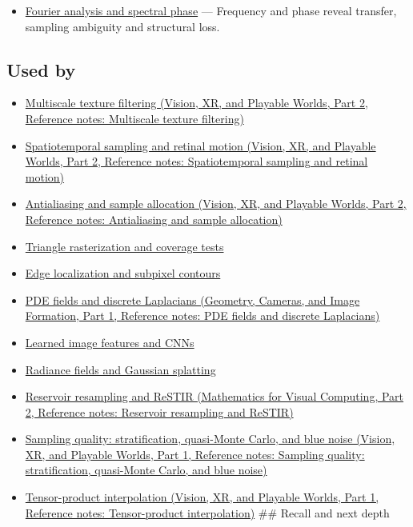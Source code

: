 \hypertarget{appendix-6a7869dd79a6-prerequisites}{}

\begin{itemize}
\tightlist
\item
  \hyperref[appendix-b60686ba06a1]{Fourier analysis and spectral phase} --- Frequency and phase reveal transfer, sampling ambiguity and structural loss.
\end{itemize}

\subsection{Used by}\label{appendix-6a7869dd79a6-used-by}

\hypertarget{appendix-6a7869dd79a6-used-by}{}

\begin{itemize}
\item
  \href{../07-Vision-XR-and-Playable-Worlds-P02/main.pdf\#appendix-b677a85ba76f}{Multiscale texture filtering (Vision, XR, and Playable Worlds, Part 2, Reference notes: Multiscale texture filtering)}
\item
  \href{../07-Vision-XR-and-Playable-Worlds-P02/main.pdf\#appendix-70895739febb}{Spatiotemporal sampling and retinal motion (Vision, XR, and Playable Worlds, Part 2, Reference notes: Spatiotemporal sampling and retinal motion)}
\item
  \href{../07-Vision-XR-and-Playable-Worlds-P02/main.pdf\#appendix-4192b2bdd21e}{Antialiasing and sample allocation (Vision, XR, and Playable Worlds, Part 2, Reference notes: Antialiasing and sample allocation)}
\item
  \hyperref[appendix-ed3f9bc298fe]{Triangle rasterization and coverage tests}
\item
  \hyperref[appendix-36022286b03e]{Edge localization and subpixel contours}
\item
  \href{../03-Geometry-Cameras-and-Image-Formation-P01/main.pdf\#appendix-1988d465c119}{PDE fields and discrete Laplacians (Geometry, Cameras, and Image Formation, Part 1, Reference notes: PDE fields and discrete Laplacians)}
\item
  \hyperref[appendix-47c51ea026fb]{Learned image features and CNNs}
\item
  \hyperref[appendix-c5b332e400e7]{Radiance fields and Gaussian splatting}
\item
  \href{../02-Mathematics-for-Visual-Computing-P02/main.pdf\#appendix-68be451b78b1}{Reservoir resampling and ReSTIR (Mathematics for Visual Computing, Part 2, Reference notes: Reservoir resampling and ReSTIR)}
\item
  \href{../07-Vision-XR-and-Playable-Worlds-P01/main.pdf\#appendix-9f693ffd82bc}{Sampling quality: stratification, quasi-Monte Carlo, and blue noise (Vision, XR, and Playable Worlds, Part 1, Reference notes: Sampling quality: stratification, quasi-Monte Carlo, and blue noise)}
\item
  \href{../07-Vision-XR-and-Playable-Worlds-P01/main.pdf\#appendix-0a09b6dfdc86}{Tensor-product interpolation (Vision, XR, and Playable Worlds, Part 1, Reference notes: Tensor-product interpolation)} \#\# Recall and next depth
\end{itemize}

